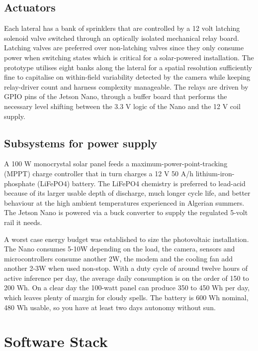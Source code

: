 \documentclass[12pt,a4paper]{report}
\begin{document}
\subsection{Actuators}

Each lateral has a bank of sprinklers that are controlled by a 12 volt latching solenoid valve switched through an optically isolated mechanical relay board. Latching valves are preferred over non-latching valves since they only consume power when switching states which is critical for a solar-powered installation. The prototype utilises eight banks along the lateral for a spatial resolution sufficiently fine to capitalise on within-field variability detected by the camera while keeping relay-driver count and harness complexity manageable. The relays are driven by GPIO pins of the Jetson Nano, through a buffer board that performs the necessary level shifting between the 3.3 V logic of the Nano and the 12 V coil supply.

\subsection{Subsystems for power supply}

A 100 W monocrystal solar panel feeds a maximum-power-point-tracking (MPPT) charge controller that in turn charges a 12 V 50 A/h lithium-iron-phosphate (LiFePO4) battery. The LiFePO4 chemistry is preferred to lead-acid because of its larger usable depth of discharge, much longer cycle life, and better behaviour at the high ambient temperatures experienced in Algerian summers. The Jetson Nano is powered via a buck converter to supply the regulated 5-volt rail it needs.

A worst case energy budget was established to size the photovoltaic installation. The Nano consumes 5-10W depending on the load, the camera, sensors and microcontrollers consume another 2W, the modem and the cooling fan add another 2-3W when used non-stop. With a duty cycle of around twelve hours of active inference per day, the average daily consumption is on the order of 150 to 200 Wh. On a clear day the 100-watt panel can produce 350 to 450 Wh per day, which leaves plenty of margin for cloudy spells. The battery is 600 Wh nominal, 480 Wh usable, so you have at least two days autonomy without sun.

\section{Software Stack}
\end{document}
